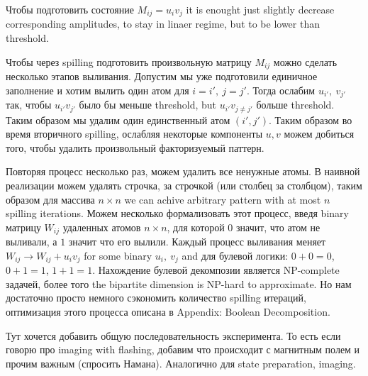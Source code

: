 Чтобы подготовить состояние $M_{ij} = u_i v_j$ it is enought just slightly decrease corresponding amplitudes, to stay in linaer regime, but to be lower than threshold.

Чтобы через spilling подготовить произвольную матрицу $M_{ij}$ можно сделать несколько этапов выливания. Допустим мы уже подготовили единичное заполнение и хотим вылить один атом для $i=i',\ j=j'$. Тогда ослабим $u_{i'},\ v_{j'}$ так, чтобы $u_{i'} v_{j'}$ было бы меньше threshold, but $u_{i'} v_{j \neq j'}$ больше threshold. Таким образом мы удалим один единственный атом $(i', j')$. Таким образом во время вторичного spilling, ослабляя некоторые компоненты $u,v$ можем добиться того, чтобы удалить произвольный факторизуемый паттерн. 

Повторяя процесс несколько раз, можем удалить все ненужные атомы. В наивной реализации можем удалять строчка, за строчкой (или столбец за столбцом), таким образом для массива $n \times n$ we can achive arbitrary pattern with at most $n$ spilling iterations. Можем несколько формализовать этот процесс, введя binary матрицу $W_{ij}$ удаленных атомов $n \times n$, для которой $0$ значит, что атом не выливали, а $1$ значит что его вылили. Каждый процесс выливания меняет $W_{ij} \to W_{ij} + u_i v_j$ for some binary $u_i, \ v_j$ and для булевой логики: $0+0=0$, $0+1=1$, $1+1=1$. Нахождение булевой декомпозии является NP-complete задачей, более того  the bipartite dimension is NP-hard to approximate. Но нам достаточно просто немного сэкономить количество spilling итераций, оптимизация этого процесса описана в Appendix: Boolean Decomposition. 


Тут хочется добавить общую последовательность эксперимента. То есть если говорю про imaging with flashing, добавим что происходит с магнитным полем и прочим важным (спросить Намана). Аналогично для state preparation, imaging.



